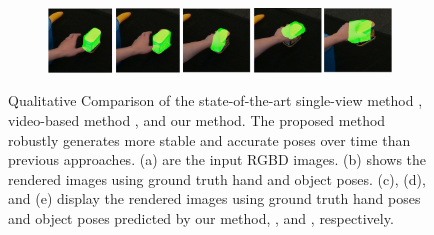 \begin{figure}[!ht]
\begin{subfigure}{0.98\textwidth}
        \includegraphics[width=\linewidth]{figs/1_3}
        \caption{\cite{castro2023crt}}
    \end{subfigure}
    \caption{Qualitative Comparison of the state-of-the-art single-view method \cite{castro2023crt}, video-based method \cite{wang2023deep},
and our method. The proposed method robustly generates more stable and accurate poses over time than previous approaches. (a) are the input RGBD images. (b) shows the rendered images using ground truth hand and object poses. (c), (d), and (e) display the rendered images using ground truth hand poses and object poses predicted by our method, \cite{wang2023deep}, and \cite{castro2023crt}, respectively.}
    \label{fig:result1}
\end{figure}

